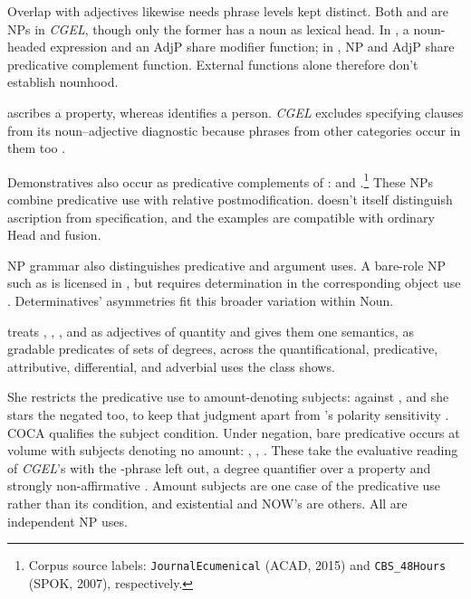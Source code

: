 \documentclass[12pt]{article}
\begin{document}
Overlap with adjectives likewise needs phrase levels kept distinct. Both  and  are NPs in \textit{CGEL}, though only the former has a noun as lexical head. In , a noun-headed expression and an AdjP share modifier function; in , NP and AdjP share predicative complement function. External functions alone therefore don't establish nounhood.

 ascribes a property, whereas  identifies a person. \textit{CGEL} excludes specifying  clauses from its noun--adjective diagnostic because phrases from other categories occur in them too \citep[536]{huddleston2002}.

Demonstratives also occur as predicative complements of :  and .\footnote{Corpus source labels: \texttt{JournalEcumenical} (ACAD, 2015) and \texttt{CBS\_48Hours} (SPOK, 2007), respectively.} These NPs combine predicative use with relative postmodification.  doesn't itself distinguish ascription from specification, and the examples are compatible with ordinary Head and fusion.

NP grammar also distinguishes predicative and argument uses. A bare-role NP such as  is licensed in , but requires determination in the corresponding object use  \citep[328]{huddleston2002}. Determinatives' asymmetries fit this broader variation within Noun.

\textcite{solt2015qadjectives} treats , , , and  as adjectives of quantity and gives them one semantics, as gradable predicates of sets of degrees, across the quantificational, predicative, attributive, differential, and adverbial uses the class shows.

She restricts the predicative use to amount-denoting subjects:  against , and she stars the negated  too, to keep that judgment apart from 's polarity sensitivity \citep[(76)--(77)]{solt2015qadjectives}. COCA qualifies the subject condition. Under negation, bare predicative  occurs at volume with subjects denoting no amount: , , . These take the evaluative reading of \textit{CGEL}'s  with the -phrase left out, a degree quantifier over a property and strongly non-affirmative \citep[415]{huddleston2002}. Amount subjects are one case of the predicative use rather than its condition, and existential  and NOW's  are others. All are independent NP uses.
\end{document}
